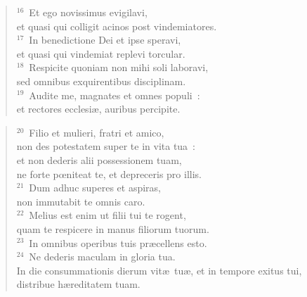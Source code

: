 \begin{flushleft}\begin{verse}${}^{16}$~Et ego novissimus evigilavi,\\ et quasi qui colligit acinos post vindemiatores.\\
${}^{17}$~In benedictione Dei et ipse speravi,\\ et quasi qui vindemiat replevi torcular.\\
${}^{18}$~Respicite quoniam non mihi soli laboravi,\\ sed omnibus exquirentibus disciplinam.\\
${}^{19}$~Audite me, magnates et omnes populi~:\\ et rectores ecclesi\ae , auribus percipite.\end{verse}\end{flushleft}


\begin{flushleft}\begin{verse}${}^{20}$~Filio et mulieri, fratri et amico,\\ non des potestatem super te in vita tua~:\\ et non dederis alii possessionem tuam,\\ ne forte pœniteat te, et depreceris pro illis.\\
${}^{21}$~Dum adhuc superes et aspiras,\\ non immutabit te omnis caro.\\
${}^{22}$~Melius est enim ut filii tui te rogent,\\ quam te respicere in manus filiorum tuorum.\\
${}^{23}$~In omnibus operibus tuis pr\ae cellens esto.\\
${}^{24}$~Ne dederis maculam in gloria tua.\\ In die consummationis dierum vit\ae\ tu\ae , et in tempore exitus tui,\\ distribue h\ae reditatem tuam.\end{verse}\end{flushleft}


